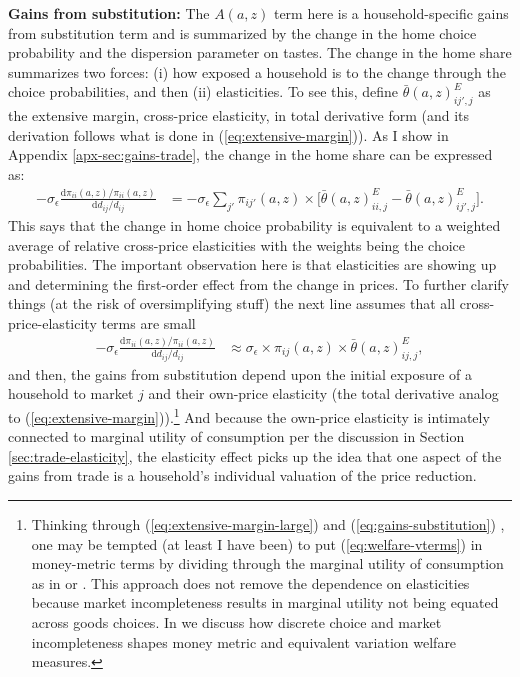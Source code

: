 \documentclass[12pt,pdftex]{article}
\begin{document}
\begin{onehalfspacing}
\textbf{Gains from substitution:} The $A(a,z)$ term here is a household-specific gains from substitution term and is summarized by the change in the home choice probability and the dispersion parameter on tastes. The change in the home share summarizes two forces: (i) how exposed a household is to the change through the choice probabilities, and then (ii) elasticities. To see this, define $\bar{\theta}(a,z) ^E_{ij',j}$ as the extensive margin, cross-price elasticity, in total derivative form (and its derivation follows what is done in (\ref{eq:extensive-margin})). As I show in Appendix \ref{apx-sec:gains-trade}, the change in the home share can be expressed as:
\begin{align}
-\sigma_{\epsilon} \frac{\mathrm{d} \pi_{ii}(a,z) / \pi_{ii}(a,z) }{\mathrm{d} d_{ij} / d_{ij}} &= -\sigma_{\epsilon} \sum_{j'} \pi_{ij'}(a,z) \times \bigg[ \bar{\theta}(a,z) ^E_{ii,j} - \bar{\theta}(a,z) ^E_{ij',j}\bigg]. \label{eq:gains-substitution-cross-price}
\end{align}
This says that the change in home choice probability is equivalent to a weighted average of relative cross-price elasticities with the weights being the choice probabilities. The important observation here is that elasticities are showing up and determining the first-order effect from the change in prices. To further clarify things (at the risk of oversimplifying stuff) the next line assumes that all cross-price-elasticity terms are small
\begin{align}
-\sigma_{\epsilon} \frac{\mathrm{d} \pi_{ii}(a,z) / \pi_{ii}(a,z) }{\mathrm{d} d_{ij} / d_{ij}} & \approx
\sigma_{\epsilon} \times \pi_{ij}(a,z) \times \bar{\theta}(a,z) ^E_{ij,j},
\label{eq:gains-substitution}
\end{align}
and then, the gains from substitution depend upon the initial exposure of a household to market $j$ and their own-price elasticity (the total derivative analog to (\ref{eq:extensive-margin})).\footnote{Thinking through (\ref{eq:extensive-margin-large}) and (\ref{eq:gains-substitution}) , one may be tempted (at least I have been) to put (\ref{eq:welfare-vterms}) in money-metric terms by dividing through the marginal utility of consumption as in \citet{walsh2023inflationary} or \citet{moll2022asset}. This approach does not remove the dependence on elasticities because market incompleteness results in marginal utility not being equated across goods choices. In \citet{mongey-waugh-2} we discuss how discrete choice and market incompleteness shapes money metric and equivalent variation welfare measures.} And because the own-price elasticity is intimately connected to marginal utility of consumption per the discussion in Section \ref{sec:trade-elasticity}, the elasticity effect picks up the idea that one aspect of the gains from trade is a household's individual valuation of the price reduction.


\end{onehalfspacing}
\end{document}
